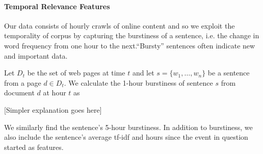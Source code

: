 \paragraph{Temporal Relevance Features}

Our data consists of hourly crawls of online content and so we exploit the temporality of corpus by capturing the burstiness of a sentence, i.e.  the change in word frequency from one hour to the next.``Bursty'' sentences often indicate new and important data. 

Let $D_t$ be the set of web pages at time $t$ and let $s = \{w_1,\ldots,w_n\}$ be a sentence from a page $d \in D_t$.  We calculate the 1-hour burstiness of sentence $s$ from document $d$ at hour $t$  as 


[\textrm{Simpler explanation goes here}]


We similarly find the sentence's 5-hour burstiness.  In addition to burstiness, we also include the sentence's average tf-idf and hours since the event in question started as features.


